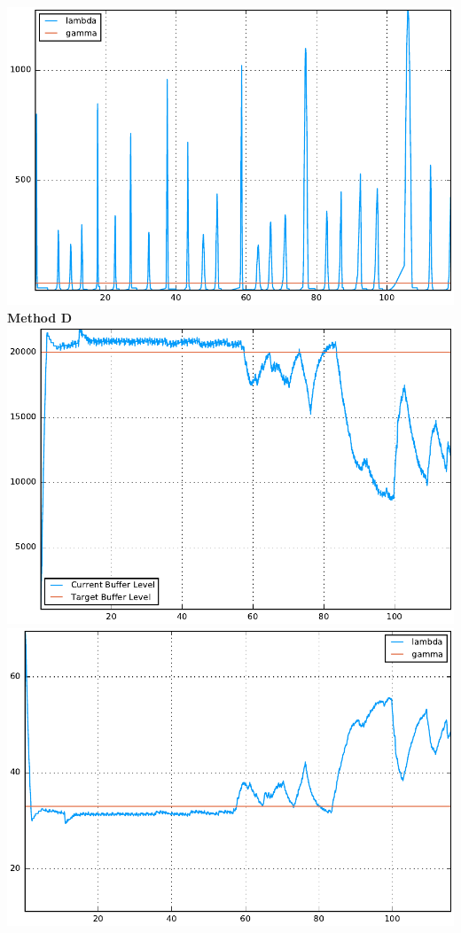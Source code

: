 \documentclass[12pt]{article}
\newenvironment{problem}[2][Problem]{\begin{trivlist}
\item[\hskip \labelsep {\bfseries #1}\hskip \labelsep {\bfseries #2.}]}{\end{trivlist}}
\begin{document}
\begin{problem}{1}
\includegraphics[scale = .5]{stream2.pdf}
\\
\textbf{Method D}
\\
\includegraphics[scale = .5]{listen3.pdf}
\includegraphics[scale = .5]{stream3.pdf}

\end{problem}
\end{document}
